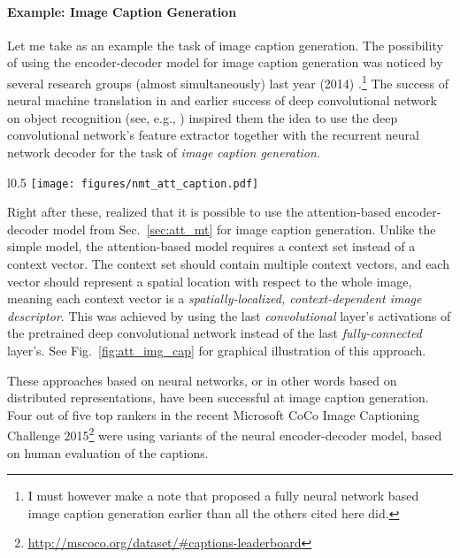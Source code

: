 \documentclass{report}
\begin{document}
\paragraph{Example: Image Caption Generation}

Let me take as an example the task of image caption generation.  The possibility
of using the encoder-decoder model for image caption generation was noticed by
several research groups (almost simultaneously) last year (2014)
\citep{Kiros-et-al-ICML2014,vinyals2014show,Karpathy+Li-arxiv2014,Mao+al-arxiv2014,Donahue-et-al-arxiv2014,Fang-et-al-arxiv2014,Chen+Zitnick-arxiv2014}.\footnote{
    I must however make a note that \citet{Kiros-et-al-ICML2014}
    proposed a fully neural network based image caption generation earlier than
    all the others cited here did.
} The success of neural machine translation in \citet{sutskever2014sequence} and
earlier success of deep convolutional network on object recognition (see, e.g.,
\citet{krizhevsky2012imagenet,simonyan2014very,szegedy2014going}) inspired them
the idea to use the deep convolutional network's feature extractor together with
the recurrent neural network decoder for the task of {\em image caption
generation}. 

\begin{wrapfigure}{l}{0.5\textwidth}
    \centering
    \texttt{[image: figures/nmt\_att\_caption.pdf]}
    \caption{Image caption generation with the attention-based
    encoder-decoder model \citep{xu2015show}.}
    \label{fig:att_img_cap}
\end{wrapfigure}

Right after these, \citet{xu2015show} realized that it is possible to
use the attention-based encoder-decoder model from Sec.~\ref{sec:att_mt} for
image caption generation. Unlike the simple model, the attention-based model
requires a context set instead of a context vector. The context set should
contain multiple context vectors, and each vector should represent a spatial
location with respect to the whole image, meaning each context vector is a {\em
spatially-localized, context-dependent image descriptor}. This was achieved by
using the last {\em convolutional} layer's activations of the pretrained deep
convolutional network instead of the last {\em fully-connected} layer's. See
Fig.~\ref{fig:att_img_cap} for graphical illustration of this approach.

These approaches based on neural networks, or in other words based on
distributed representations, have been successful at image caption generation.
Four out of five top rankers in the recent Microsoft CoCo Image Captioning
Challenge 2015\footnote{
    \url{http://mscoco.org/dataset/\#captions-leaderboard}
} 
were using variants of the neural encoder-decoder model, based on human
evaluation of the captions. 
\end{document}
